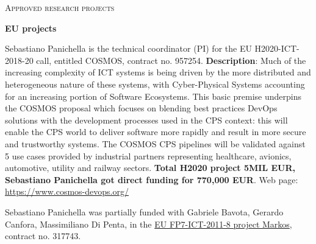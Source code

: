 \documentclass[11pt]{article}
\newcommand{\ins}[1]{\textcolor{blue}{\uline{#1}}} %
\newcommand{\ins}[1]{#1} %
\newcommand\on[1]{\nbc{ON}{#1}{red}} %
\begin{document}

\vspace{2.5mm}


\textsc{Approved research projects}
\vspace{1.5mm}


\textbf{EU projects}
\begin{innerlist}
\item Sebastiano Panichella is the technical coordinator (PI) for the EU H2020-ICT-2018-20 call, entitled COSMOS, contract no. 957254. \textbf{Description}: Much of the increasing complexity of ICT systems is being driven by the more distributed and heterogeneous nature of these systems, with Cyber-Physical Systems accounting for an increasing portion of Software Ecosystems. This basic premise underpins the COSMOS proposal which focuses on blending best practices DevOps solutions with the development processes used in the CPS context: this will enable the CPS world to deliver software more rapidly and result in more secure and trustworthy systems. 
The COSMOS CPS pipelines will be validated against 5 use cases provided by industrial partners representing healthcare, avionics, automotive, utility and railway sectors.  
\textbf{Total H2020 project 5MIL EUR, Sebastiano Panichella got direct funding for 770,000 EUR}. Web page: \href{https://www.cosmos-devops.org/}{https://www.cosmos-devops.org/}
   \item Sebastiano Panichella was 
    partially funded with Gabriele Bavota, Gerardo Canfora, Massimiliano Di Penta, in the \href{��http://www.markosproject.eu/��}
                   {EU FP7-ICT-2011-8 project Markos}, contract no. 317743. 
\end{innerlist}
\end{document}
